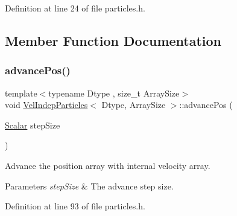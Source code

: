 Definition at line 24 of file particles.\+h.



\subsection{Member Function Documentation}
\mbox{\label{class_vel_indep_particles_aff530f9e2dbd6dc053e251caa07464ad}} 
\subsubsection{\texorpdfstring{advance\+Pos()}{advancePos()}}
{\footnotesize\ttfamily template$<$typename Dtype , size\+\_\+t Array\+Size$>$ \\
void \mbox{\hyperlink{class_vel_indep_particles}{Vel\+Indep\+Particles}}$<$ Dtype, Array\+Size $>$\+::advance\+Pos (\begin{DoxyParamCaption}\item[{\mbox{\hyperlink{class_vel_indep_particles_a5d275b22f0d759f360ddd80e78f4b466}{Scalar}}}]{step\+Size }\end{DoxyParamCaption})\hspace{0.3cm}{\ttfamily [inline]}}



Advance the position array with internal velocity array. 


\begin{DoxyParams}{Parameters}
{\em step\+Size} & The advance step size. \\
\hline
\end{DoxyParams}


Definition at line 93 of file particles.\+h.

